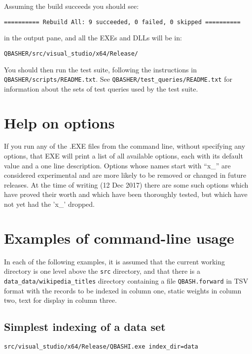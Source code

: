 \documentclass{article}
\begin{document}
\noindent Assuming the build succeeds you should see:

\begin{verbatim}
========== Rebuild All: 9 succeeded, 0 failed, 0 skipped ==========
\end{verbatim}

\noindent in the output pane, and all the EXEs and DLLs will be in:

\begin{verbatim}
QBASHER/src/visual_studio/x64/Release/
\end{verbatim}

You should then run the test suite, following the instructions in
\texttt{QBASHER/scripts/README.txt}. See
\texttt{QBASHER/test\_queries/README.txt} for information about the
sets of test queries used by the test suite.

\section{Help on options}
If you run any of the .EXE files from the command line, without
specifying any options, that EXE will print a list of all available
options, each with its default value and a one line description.
Options whose names start with ``x\_'' are considered experimental and
are more likely to be removed or changed in future releases.    At the
time of writing (12 Dec 2017) there are some such options which have
proved their worth and which have been thoroughly tested, but which
have not yet had the 'x\_' dropped.


\section{Examples of command-line usage}

In each of the following examples, it is assumed that the current
working directory is one level above the \texttt{src} directory, and
that there is a \texttt{data\_data/wikipedia\_titles} directory containing a file
\texttt{QBASH.forward} in TSV format with the records to be
indexed in column one, static weights in column two, text for display
in column three.


\subsection{Simplest indexing of a data set}

{\footnotesize
\begin{verbatim}
src/visual_studio/x64/Release/QBASHI.exe index_dir=data
\end{verbatim}
}
\end{document}
